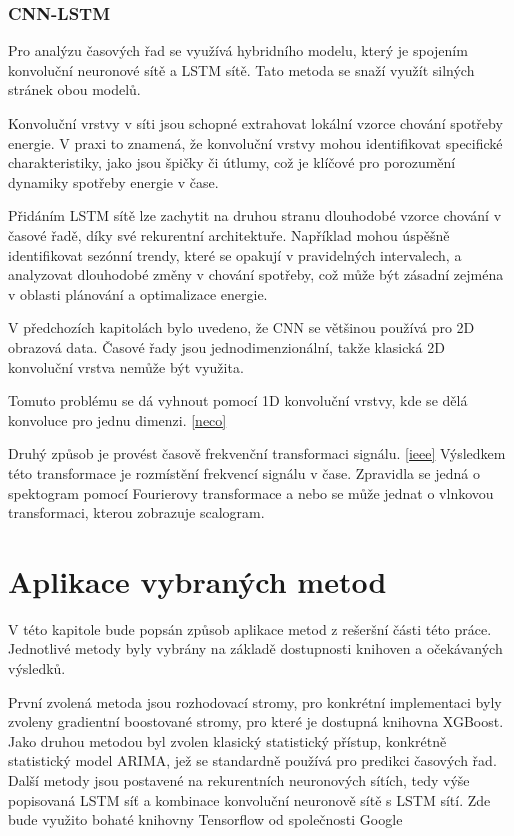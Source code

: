 \documentclass[FM,BP,fonts]{tulthesis}
\begin{document}
\subsection{CNN-LSTM}
Pro analýzu časových řad se využívá hybridního modelu, který je spojením konvoluční neuronové sítě a LSTM sítě. Tato metoda se snaží využít silných stránek obou modelů. 

Konvoluční vrstvy v síti jsou schopné extrahovat lokální vzorce chování spotřeby energie. V praxi to znamená, že konvoluční vrstvy mohou identifikovat specifické charakteristiky, jako jsou špičky či útlumy, což je klíčové pro porozumění dynamiky spotřeby energie v čase. 

Přidáním LSTM sítě lze zachytit na druhou stranu dlouhodobé vzorce chování v časové řadě, díky své rekurentní architektuře.
 Například mohou úspěšně identifikovat sezónní trendy, které se opakují v pravidelných intervalech, a analyzovat dlouhodobé změny v chování spotřeby, což může být zásadní zejména v oblasti plánování a optimalizace energie. 

V předchozích kapitolách bylo uvedeno, že CNN se většinou používá pro 2D obrazová data. Časové řady jsou  jednodimenzionální, takže klasická 2D konvoluční vrstva nemůže být využita.

Tomuto problému se dá vyhnout pomocí 1D konvoluční vrstvy, kde se dělá konvoluce pro jednu dimenzi. \ref{neco}

Druhý způsob je provést časově frekvenční transformaci signálu. \ref{ieee} Výsledkem této transformace je rozmístění frekvencí signálu v čase. Zpravidla se jedná o spektogram pomocí Fourierovy transformace a nebo se může jednat o vlnkovou transformaci, kterou zobrazuje scalogram.


\chapter{Aplikace vybraných metod}
V této kapitole bude popsán způsob aplikace metod z rešeršní části této práce. Jednotlivé metody byly vybrány na základě dostupnosti knihoven a očekávaných výsledků.

První zvolená metoda jsou rozhodovací stromy, pro konkrétní implementaci byly zvoleny gradientní boostované stromy, pro které je dostupná knihovna XGBoost. Jako druhou metodou byl zvolen klasický statistický přístup, konkrétně statistický model ARIMA, jež se standardně používá pro predikci časových řad. Další metody jsou postavené na rekurentních neuronových sítích, tedy výše popisovaná LSTM síť a kombinace konvoluční neuronově sítě s LSTM sítí. Zde bude využito bohaté knihovny Tensorflow od společnosti Google
\end{document}
